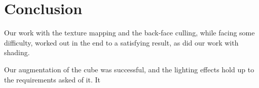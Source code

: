 \section{Conclusion}
Our work with the texture mapping and the back-face culling, while facing some difficulty, worked out in the end to a satisfying result, as did our work with shading.

Our augmentation of the cube was successful, and the lighting effects hold up to the requirements asked of it. It 